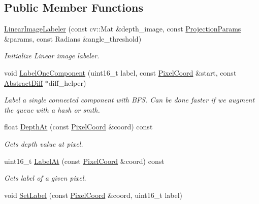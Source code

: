 \subsection*{Public Member Functions}
\begin{DoxyCompactItemize}
\item 
\hyperlink{classdepth__clustering_1_1LinearImageLabeler_ad1026a0b49c300c6415691716b5acb99}{Linear\+Image\+Labeler} (const cv\+::\+Mat \&depth\+\_\+image, const \hyperlink{classdepth__clustering_1_1ProjectionParams}{Projection\+Params} \&params, const Radians \&angle\+\_\+threshold)
\begin{DoxyCompactList}\small\item\em Initialize Linear image labeler. \end{DoxyCompactList}\item 
void \hyperlink{classdepth__clustering_1_1LinearImageLabeler_ac5544f26628a05978a6a989ade6a1cd6}{Label\+One\+Component} (uint16\+\_\+t label, const \hyperlink{structdepth__clustering_1_1PixelCoord}{Pixel\+Coord} \&start, const \hyperlink{classdepth__clustering_1_1AbstractDiff}{Abstract\+Diff} $\ast$diff\+\_\+helper)
\begin{DoxyCompactList}\small\item\em Label a single connected component with B\+FS. Can be done faster if we augment the queue with a hash or smth. \end{DoxyCompactList}\item 
float \hyperlink{classdepth__clustering_1_1LinearImageLabeler_abef293e252cf1afcac619f643f376921}{Depth\+At} (const \hyperlink{structdepth__clustering_1_1PixelCoord}{Pixel\+Coord} \&coord) const
\begin{DoxyCompactList}\small\item\em Gets depth value at pixel. \end{DoxyCompactList}\item 
uint16\+\_\+t \hyperlink{classdepth__clustering_1_1LinearImageLabeler_a4389f0085999f71cc283d6c378a2536a}{Label\+At} (const \hyperlink{structdepth__clustering_1_1PixelCoord}{Pixel\+Coord} \&coord) const
\begin{DoxyCompactList}\small\item\em Gets label of a given pixel. \end{DoxyCompactList}\item 
void \hyperlink{classdepth__clustering_1_1LinearImageLabeler_a4693e920b2245f70206a11e141ddcb8f}{Set\+Label} (const \hyperlink{structdepth__clustering_1_1PixelCoord}{Pixel\+Coord} \&coord, uint16\+\_\+t label)

\end{DoxyCompactItemize}
